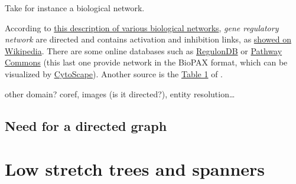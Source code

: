 \documentclass[nobib, a4paper, 10pt, oneside, onecolumn, openany, notitlepage, final,
svgnames, marginals=raggedouter, english,
]{article}
\begin{document}
Take for instance a biological network.

According to \href{https://web.stanford.edu/class/cs224w/slides/handout-bionets.pdf}%
{this description of various biological networks}, \emph{gene regulatory network} are directed and
contains activation and inhibition links, as \href{https://en.wikipedia.org/wiki/Gene_regulatory_network#Overview}%
{showed on Wikipedia}. There are some online databases such as
\href{http://regulondb.ccg.unam.mx/menu/download/datasets/index.jsp}%
{RegulonDB} or \href{http://www.pathwaycommons.org/pcviz/}{Pathway Commons} (this last one provide
network in the BioPAX format, which can be visualized by
\href{http://www.cytoscape.org/}{CytoScape}).
Another source is the \href{https://www.ncbi.nlm.nih.gov/pmc/articles/PMC2708159/table/T1}{Table 1}
of \cite{BioSigned09}.

other domain? coref, images (is it directed?), entity resolution…
\fi

\subsection{Need for a directed graph}
\label{sub:need_for_a_directed_graph}

\iffalse
A more serious limitation is that our sign model only applies to directed graphs. Consider
another model, where each node $i$ is endowed with an integer $c_i \in \{1, \ldots, k\}$ that
specifies its cluster and let the sign of the undirected edge $i,j$ be $+$ if $c_i = c_j$ and $-$
otherwise.  This corresponds naturally to the situation modeled by the \pcc{} problem.
\fi

\section{\pcc{}}
\label{sec:correlation_clustering}



\newpage

\section{Low stretch trees and spanners}
\label{sec:low_stretch_trees_and_spanners}
\end{document}
